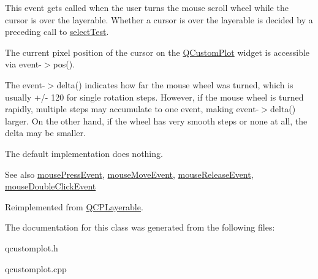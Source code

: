 This event gets called when the user turns the mouse scroll wheel while the cursor is over the layerable. Whether a cursor is over the layerable is decided by a preceding call to \hyperlink{classQCPAxis_a63b7103c57fe9acfbce164334ea837f8}{select\+Test}.

The current pixel position of the cursor on the \hyperlink{classQCustomPlot}{Q\+Custom\+Plot} widget is accessible via {\ttfamily event-\/$>$pos()}.

The {\ttfamily event-\/$>$delta()} indicates how far the mouse wheel was turned, which is usually +/-\/ 120 for single rotation steps. However, if the mouse wheel is turned rapidly, multiple steps may accumulate to one event, making {\ttfamily event-\/$>$delta()} larger. On the other hand, if the wheel has very smooth steps or none at all, the delta may be smaller.

The default implementation does nothing.

\begin{DoxySeeAlso}{See also}
\hyperlink{classQCPAxis_a61bc07cda6193a3fa6b5aa198fc4e4fa}{mouse\+Press\+Event}, \hyperlink{classQCPAxis_ac5a269609e6177737faabdc46434d8c7}{mouse\+Move\+Event}, \hyperlink{classQCPAxis_a780bee321fc6476e5fc49c4980291a01}{mouse\+Release\+Event}, \hyperlink{classQCPLayerable_a4171e2e823aca242dd0279f00ed2de81}{mouse\+Double\+Click\+Event} 
\end{DoxySeeAlso}


Reimplemented from \hyperlink{classQCPLayerable_a47dfd7b8fd99c08ca54e09c362b6f022}{Q\+C\+P\+Layerable}.



The documentation for this class was generated from the following files\+:\begin{DoxyCompactItemize}
\item 
qcustomplot.\+h\item 
qcustomplot.\+cpp\end{DoxyCompactItemize}
